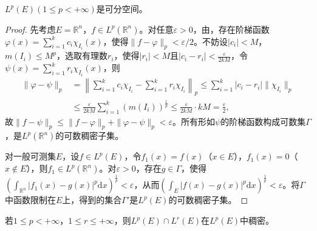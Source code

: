 \documentclass[../../main.tex]{subfiles}%
\begin{document}
\begin{theorem}
$L^p(E)(1\leqslant p<+\infty)$是可分空间。
\end{theorem}
\begin{proof}
先考虑$E=\mathbb{R}^n$，$f\in L^p(\mathbb{R}^n)$。对任意$\varepsilon>0$，由，存在阶梯函数$\varphi(x)=\sum\limits_{i=1}^k c_i\chi_{I_i}(x)$，使得$\|f-\varphi\|_p<\varepsilon/2$。不妨设$|c_i|<M$，$m(I_i)\leqslant M^p$，选取有理数$r_i$，使得$|r_i|<M$且$|c_i-r_i|<\frac{\varepsilon}{2kM}$，令$\psi(x)=\sum\limits_{i=1}^k r_i\chi_{I_i}(x)$，则
\begin{align*}
\|\varphi-\psi\|_p&=\left\|\sum\limits_{i=1}^k c_i\chi_{I_i}-\sum\limits_{i=1}^k r_i\chi_{I_i}\right\|_p
\leqslant\sum\limits_{i=1}^k |c_i-r_i|\|\chi_{I_i}\|_p\\
&\leqslant\frac{\varepsilon}{2kM}\sum\limits_{i=1}^k (m(I_i))^{\frac{1}{p}}\leqslant\frac{\varepsilon}{2kM}\cdot kM=\frac{\varepsilon}{2},
\end{align*}
故$\|f-\psi\|_p\leqslant\|f-\varphi\|_p+\|\varphi-\psi\|_p<\varepsilon$。所有形如$\psi$的阶梯函数构成可数集$\Gamma$，是$L^p(\mathbb{R}^n)$的可数稠密子集。

对一般可测集$E$，设$f\in L^p(E)$，令$f_1(x)=f(x)$（$x\in E$），$f_1(x)=0$（$x\notin E$），则$f_1\in L^p(\mathbb{R}^n)$。对$\varepsilon>0$，存在$g\in\Gamma$，使得$\left(\int_{\mathbb{R}^n}|f_1(x)-g(x)|^p\mathrm{d}x\right)^{\frac{1}{p}}<\varepsilon$，从而$\left(\int_E|f(x)-g(x)|^p\mathrm{d}x\right)^{\frac{1}{p}}<\varepsilon$。将$\Gamma$中函数限制在$E$上，得到的集合$\Gamma'$是$L^p(E)$的可数稠密子集。
\end{proof}

\begin{corollary}
若$1\leqslant p<+\infty$，$1\leqslant r\leqslant+\infty$，则$L^p(E)\cap L^r(E)$在$L^p(E)$中稠密。
\end{corollary}
\end{document}
